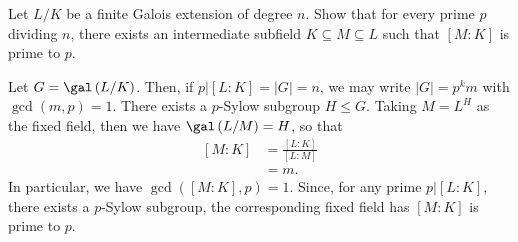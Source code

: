 \documentclass[10pt]{mypackage}
\begin{document}
\begin{problem}[Problem 6]
  Let $L/K$ be a finite Galois extension of degree $n$. Show that for every prime $p$ dividing $n$, there exists an intermediate subfield $K\subseteq M\subseteq L$ such that $\left[ M:K \right]$ is prime to $p$.
\end{problem}
\begin{solution}
  Let $G = \gal\left( L/K \right)$. Then, if $p | \left[ L:K \right] = \left\vert G \right\vert = n$, we may write $\left\vert G \right\vert = p^{k}m$ with $\gcd\left( m,p \right) = 1$. There exists a $p$-Sylow subgroup $H\leq G$. Taking $M = L^{H}$ as the fixed field, then we have $\gal\left( L/M \right) = H$, so that
  \begin{align*}
    \left[ M:K \right] &= \frac{\left[ L:K \right]}{\left[ L:M \right]}\\
                       &= m.
  \end{align*}
  In particular, we have $\gcd\left( \left[ M:K \right],p \right) = 1$. Since, for any prime $p | \left[ L:K \right]$, there exists a $p$-Sylow subgroup, the corresponding fixed field has $\left[ M:K \right]$ is prime to $p$.
\end{solution}
\end{document}
